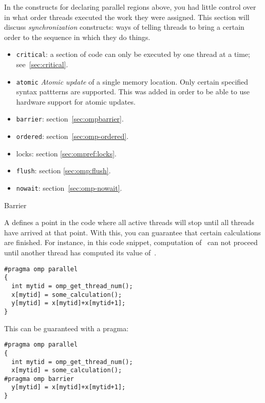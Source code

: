 

In the constructs for declaring parallel regions above, you had little control over 
in what order threads executed the work they were assigned.
This section will discuss \emph{synchronization} constructs: ways of telling
threads to bring a certain order to the sequence in which they do things.

\begin{itemize}
\item \texttt{critical}: a section of code can only be executed by one
  thread at a time; see~\ref{sec:critical}.
\item \texttt{atomic} \emph{Atomic update}
  of a single memory location. Only certain
  specified syntax pattterns are supported. This was added in order to
  be able to use hardware support for atomic updates.
\item \texttt{barrier}: section~\ref{sec:ompbarrier}.
\item \texttt{ordered}: section~\ref{sec:omp-ordered}.
\item locks: section \ref{sec:ompref:locks}.
\item \texttt{flush}: section \ref{sec:omp:flush}.
\item \texttt{nowait}: section~\ref{sec:omp-nowait}.
\end{itemize}

 {Barrier}
\label{sec:ompbarrier}

A  defines a point in the code where all active threads will stop
until all threads have arrived at that point. With this, you can guarantee that
certain calculations are finished. For instance, in this code snippet, computation 
of~ can not proceed until another thread has computed its value of~.
\begin{lstlisting}
#pragma omp parallel 
{
  int mytid = omp_get_thread_num();
  x[mytid] = some_calculation();
  y[mytid] = x[mytid]+x[mytid+1];
}
\end{lstlisting}
This can be guaranteed with a  pragma:
\begin{lstlisting}
#pragma omp parallel 
{
  int mytid = omp_get_thread_num();
  x[mytid] = some_calculation();
#pragma omp barrier
  y[mytid] = x[mytid]+x[mytid+1];
}
\end{lstlisting}

